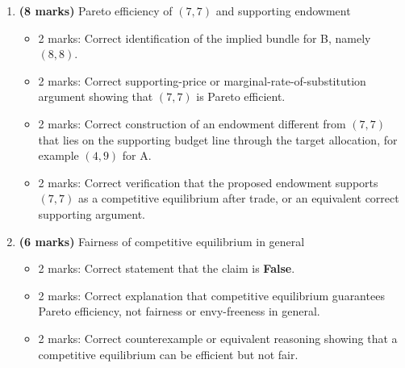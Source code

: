 \documentclass[12pt]{article}
\begin{document}
\begin{enumerate}[label=(\alph*)]
    \item \textbf{(8 marks)} Pareto efficiency of \((7,7)\) and supporting endowment
    \begin{itemize}
        \item 2 marks: Correct identification of the implied bundle for B, namely \((8,8)\).
        \item 2 marks: Correct supporting-price or marginal-rate-of-substitution argument showing that \((7,7)\) is Pareto efficient.
        \item 2 marks: Correct construction of an endowment different from \((7,7)\) that lies on the supporting budget line through the target allocation, for example \((4,9)\) for A.
        \item 2 marks: Correct verification that the proposed endowment supports \((7,7)\) as a competitive equilibrium after trade, or an equivalent correct supporting argument.
    \end{itemize}

    \item \textbf{(6 marks)} Fairness of competitive equilibrium in general
    \begin{itemize}
        \item 2 marks: Correct statement that the claim is \textbf{False}.
        \item 2 marks: Correct explanation that competitive equilibrium guarantees Pareto efficiency, not fairness or envy-freeness in general.
        \item 2 marks: Correct counterexample or equivalent reasoning showing that a competitive equilibrium can be efficient but not fair.
    \end{itemize}
\end{enumerate}
\end{document}
